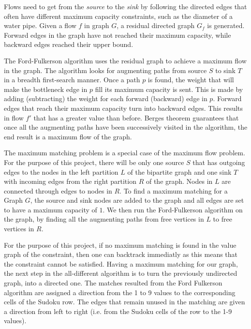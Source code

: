 \documentclass{l4proj}
\begin{document}
\noindent Flows need to get from the \textit{source} to the \textit{sink} by following the directed edges that often have different maximum capacity constraints, such as the diameter of a water pipe. Given a flow $f$ in graph $G$, a residual directed graph $G_f$ is generated. Forward edges in the graph have not reached their maximum capacity, while backward edges reached their upper bound. 

\noindent The Ford-Fulkerson algorithm  \cite{ford1956maximal} uses the residual graph to achieve a maximum flow in the graph. The algorithm looks for augmenting paths from source $S$ to sink $T$ in a breadth first-search manner. Once a path $p$ is found, the weight that will make the bottleneck edge in $p$ fill its maximum capacity is sent. This is made by adding (subtracting) the weight for each forward (backward) edge in $p$. Forward edges that reach their maximum capacity turn into backward edges. This results in flow $f'$ that has a greater value than before. Berge\textquotesingle s theorem \cite{berge1957two} guarantees that once all the augmenting paths have been successively visited in the algorithm, the end result is a maximum flow of the graph.

\noindent The maximum matching problem is a special case of the maximum flow problem. For the purpose of this project, there will be only one source $S$ that has outgoing edges to the nodes in the left partition $L$ of the bipartite graph and one sink $T$ with incoming edges from the right partition $R$ of the graph. Nodes in $L$ are connected through edges to nodes in $R$. To find a maximum matching for a Graph $G$, the source and sink nodes are added to the graph and all edges are set to have a maximum capacity of $1$. We then run the Ford-Fulkerson algorithm \cite{ford1956maximal} on the graph, by finding all the augmenting paths from free vertices in $L$ to free vertices in $R$.

\noindent For the purpose of this project, if no maximum matching is found in the value graph of the constraint, then one can backtrack immediatly as this means that the constraint cannot be satisfied. Having a maximum matching for our graph, the next step in the all-different algorithm is to turn the previously undirected graph, into a directed one. The matches resulted from the Ford Fulkerson algorithm \cite{ford1956maximal} are assigned a direction from the 1 to 9 values to the corresponding cells of the Sudoku row. The edges that remain unused in the matching are given a direction from left to right (i.e. from the Sudoku cells of the row to the 1-9 values).
\end{document}
